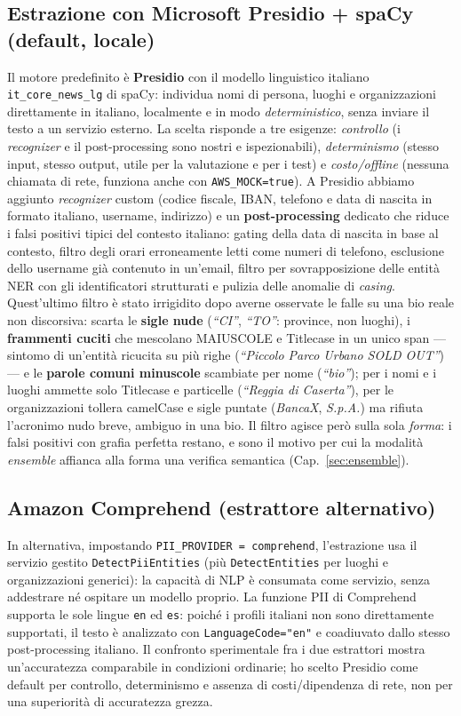 \documentclass[11pt,a4paper]{article}
\begin{document}
\subsection{Estrazione con Microsoft Presidio + spaCy (default, locale)} Il motore predefinito è
\textbf{Presidio} con il modello linguistico italiano \texttt{it\_core\_news\_lg} di
spaCy: individua nomi di persona, luoghi e organizzazioni direttamente in italiano,
localmente e in modo \emph{deterministico}, senza inviare il testo a un servizio esterno.
La scelta risponde a tre esigenze: \emph{controllo} (i \emph{recognizer} e il
post-processing sono nostri e ispezionabili), \emph{determinismo} (stesso input, stesso
output, utile per la valutazione e per i test) e \emph{costo/offline} (nessuna chiamata di
rete, funziona anche con \texttt{AWS\_MOCK=true}). A Presidio abbiamo aggiunto
\emph{recognizer} custom (codice fiscale, IBAN, telefono e data di nascita in formato
italiano, username, indirizzo) e un \textbf{post-processing} dedicato che riduce i falsi
positivi tipici del contesto italiano: gating della data di nascita in base al contesto,
filtro degli orari erroneamente letti come numeri di telefono, esclusione dello username
già contenuto in un'email, filtro per sovrapposizione delle entità NER con gli
identificatori strutturati e pulizia delle anomalie di \emph{casing}. Quest'ultimo filtro
è stato irrigidito dopo averne osservate le falle su una bio reale non discorsiva: scarta
le \textbf{sigle nude} (\emph{``CI''}, \emph{``TO''}: province, non luoghi), i
\textbf{frammenti cuciti} che mescolano MAIUSCOLE e Titlecase in un unico span --- sintomo
di un'entità ricucita su più righe (\emph{``Piccolo Parco Urbano SOLD OUT''}) --- e le
\textbf{parole comuni minuscole} scambiate per nome (\emph{``bio''}); per i nomi e i luoghi
ammette solo Titlecase e particelle (\emph{``Reggia di Caserta''}), per le organizzazioni
tollera camelCase e sigle puntate (\emph{BancaX}, \emph{S.p.A.}) ma rifiuta l'acronimo nudo
breve, ambiguo in una bio. Il filtro agisce però sulla sola \emph{forma}: i falsi positivi
con grafia perfetta restano, e sono il motivo per cui la modalità \emph{ensemble} affianca
alla forma una verifica semantica (Cap.~\ref{sec:ensemble}).

\subsection{Amazon Comprehend (estrattore alternativo)} In alternativa, impostando
\texttt{PII\_PROVIDER = comprehend}, l'estrazione usa il servizio gestito
\texttt{DetectPiiEntities} (più \texttt{DetectEntities} per luoghi e organizzazioni
generici): la capacità di NLP è consumata come servizio, senza addestrare né ospitare un
modello proprio. La funzione PII di Comprehend supporta le sole lingue \texttt{en} ed
\texttt{es}: poiché i profili italiani non sono direttamente supportati, il testo è
analizzato con \texttt{LanguageCode="en"} e coadiuvato dallo stesso post-processing
italiano. Il confronto sperimentale fra i due estrattori
mostra un'accuratezza comparabile in condizioni ordinarie; ho scelto Presidio come
default per controllo, determinismo e assenza di costi/dipendenza di rete, non per una
superiorità di accuratezza grezza.
\end{document}
